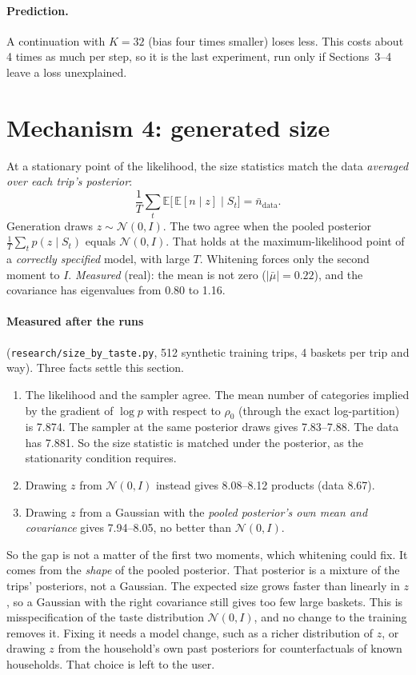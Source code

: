 \documentclass[11pt]{article}
\theoremstyle{remark}\newtheorem{remark}{Remark}
\newcommand{\E}{\mathbb{E}}
\newcommand{\N}{\mathcal{N}}
\begin{document}
\paragraph{Prediction.} A continuation with $K=32$ (bias four times smaller) loses less. This
costs about 4 times as much per step, so it is the last experiment, run only if Sections~3--4
leave a loss unexplained.

\section{Mechanism 4: generated size}\label{sec:size}

At a stationary point of the likelihood, the size statistics match the data \emph{averaged over
each trip's posterior}:
\[
\frac1T\sum_t \E\bigl[\,\E[n\mid z]\;\big|\;S_t\bigr]=\bar n_{\text{data}}.
\]
Generation draws $z\sim\N(0,I)$. The two agree when the pooled posterior
$\frac1T\sum_t p(z\mid S_t)$ equals $\N(0,I)$. That holds at the maximum-likelihood point of a
\emph{correctly specified} model, with large $T$. Whitening forces only the second moment to $I$.
\emph{Measured} (real): the mean is not zero ($|\bar\mu|=0.22$), and the covariance has eigenvalues
from 0.80 to 1.16.

\paragraph{Measured after the runs} (\texttt{research/size\_by\_taste.py}, 512 synthetic training
trips, 4 baskets per trip and way). Three facts settle this section.
\begin{enumerate}
\item The likelihood and the sampler agree. The mean number of categories implied by the gradient
  of $\log p$ with respect to $\rho_0$ (through the exact log-partition) is 7.874. The sampler at the
  same posterior draws gives 7.83--7.88. The data has 7.881. So the size statistic is matched under
  the posterior, as the stationarity condition requires.
\item Drawing $z$ from $\N(0,I)$ instead gives 8.08--8.12 products (data 8.67).
\item Drawing $z$ from a Gaussian with the \emph{pooled posterior's own mean and covariance} gives
  7.94--8.05, no better than $\N(0,I)$.
\end{enumerate}
So the gap is not a matter of the first two moments, which whitening could fix. It comes from the
\emph{shape} of the pooled posterior. That posterior is a mixture of the trips' posteriors, not a
Gaussian. The expected size grows faster than linearly in $z$, so a Gaussian with the right
covariance still gives too few large baskets. This is misspecification of the taste distribution
$\N(0,I)$, and no change to the training removes it. Fixing it needs a model change, such as a
richer distribution of $z$, or drawing $z$ from the household's own past posteriors for
counterfactuals of known households. That choice is left to the user.
\end{document}
